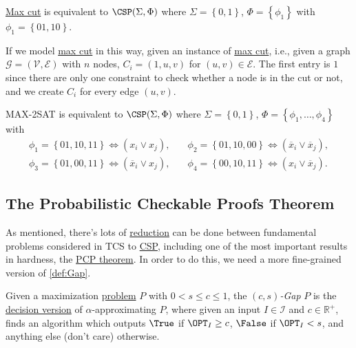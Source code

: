 \begin{eg}
	\hyperref[prb:max-cut]{Max cut} is equivalent to \(\CSP(\Sigma , \Phi )\) where \(\Sigma = \left\{ 0, 1 \right\} \), \(\Phi = \left\{ \phi _1 \right\} \) with \(\phi _1 = \left\{ 01, 10 \right\}\).
\end{eg}
\begin{explanation}
	If we model \hyperref[prb:max-cut]{max cut} in this way, given an instance of \hyperref[prb:max-cut]{max cut}, i.e., given a graph \(\mathcal{G} =(\mathcal{V} , \mathcal{E} )\) with \(n\) nodes, \(C_i = (1, u, v)\) for \((u, v)\in \mathcal{E} \). The first entry is \(1\) since there are only one constraint to check whether a node is in the cut or not, and we create \(C_i\) for every edge \((u, v)\).
\end{explanation}

\begin{eg}
	MAX-2SAT is equivalent to \(\CSP(\Sigma , \Phi )\) where \(\Sigma = \left\{ 0, 1 \right\} \), \(\Phi =\left\{ \phi _1, \dots , \phi _4  \right\} \) with
	\[
		\begin{split}
			\phi _1 = \left\{ 01, 10, 11 \right\} \iff (x_i \lor x_j),            & \quad
			\phi _2 = \left\{ 01, 10, 00 \right\} \iff (\overline{x}_i \lor \overline{x}_j), \\
			\phi _3 = \left\{ 01, 00, 11 \right\} \iff (\overline{x}_i \lor x_j), & \quad
			\phi _4 = \left\{ 00, 10, 11 \right\} \iff (x_i \lor \overline{x}_j).
		\end{split}
	\]
\end{eg}
\subsection{The Probabilistic Checkable Proofs Theorem}
As mentioned, there's lots of \hyperref[def:reduction]{reduction} can be done between fundamental problems considered in TCS to \hyperref[prb:CSP]{CSP}, including one of the most important results in hardness, the \hyperref[thm:PCP]{PCP theorem}. In order to do this, we need a more fine-grained version of \autoref{def:Gap}.

\begin{definition}[\((c, s)\)-Gap]\label{def:c-s-Gap}
	Given a maximization \hyperref[def:combinatorial-optimization]{problem} \(P\) with \(0 < s \leq c \leq 1\), the \emph{\((c, s)\)-Gap} \(P\) is the \hyperref[def:decision-P]{decision version} of \(\alpha\)-approximating \(P\), where given an input \(I\in \mathcal{I} \) and \(c\in \mathbb{R} ^+\), finds an algorithm which outputs \(\True\) if \(\OPT_I \geq c\), \(\False\) if \(\OPT_I < s\), and anything else (don't care) otherwise.
\end{definition}

